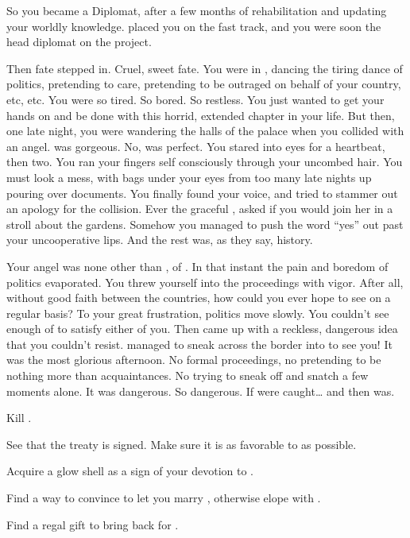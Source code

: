 \documentclass[char]{NeptuneBall}
\begin{document}
So you became a Diplomat, after a few months of rehabilitation and updating your worldly knowledge.  \pAssassin{} placed you on the fast track, and you were soon the head diplomat on the project. 

Then fate stepped in. Cruel, sweet fate. You were in \pAtlantis{}, dancing the tiring dance of politics, pretending to care, pretending to be outraged on behalf of your country, etc, etc. You were so tired. So bored. So restless. You just wanted to get your hands on \cQueen{} and be done with this horrid, extended chapter in your life. But then, one late night, you were wandering the halls of the palace when you collided with an angel. \cPrincess{\They} was gorgeous. No, \cPrincess{\they} was perfect. You stared into \cPrincess{\them} eyes for a heartbeat, then two. You ran your fingers self consciously through your uncombed hair. You must look a mess, with bags under your eyes from too many late nights up pouring over documents.  You finally found your voice, and tried to stammer out an apology for the collision. Ever the graceful \cPrincess{\prince}, \cPrincess{\they} asked if you would join her in a stroll about the gardens. Somehow you managed to push the word ``yes'' out past your uncooperative lips. And the rest was, as they say, history.

Your angel was none other than \cPrincess{}, \cPrincess{\prince} of \pAtlantis{}. In that instant the pain and boredom of politics evaporated. You threw yourself into the proceedings with vigor. After all, without good faith between the countries, how could you ever hope to see \cPrincess{} on a regular basis? To your great frustration, politics move slowly. You couldn't see enough of \cPrincess{} to satisfy either of you. Then \cPrincess{\they} came up with a reckless, dangerous idea that you couldn't resist. \cPrincess{\They} managed to sneak across the border into \pPacifica{} to see you! It was the most glorious afternoon. No formal proceedings, no pretending to be nothing more than acquaintances. No trying to sneak off and snatch a few moments alone. It was dangerous. So dangerous. If \cPrincess{\they} were caught\ldots{} and then \cPrincess{\they} was.

\begin{itemz}[Goals]
  \item Kill \cQueen{}.
  \item See that the treaty is signed. Make sure it is as favorable to \pPacifica{} as possible.
  \item Acquire a glow shell as a sign of your devotion to \cPrincess{}.
  \item Find a way to convince \cKing{} to let you marry \cPrincess{}, otherwise elope with \cPrincess{}.
  \item Find a regal gift to bring back for \cPacificanRuler{}.
\end{itemz}
\end{document}

